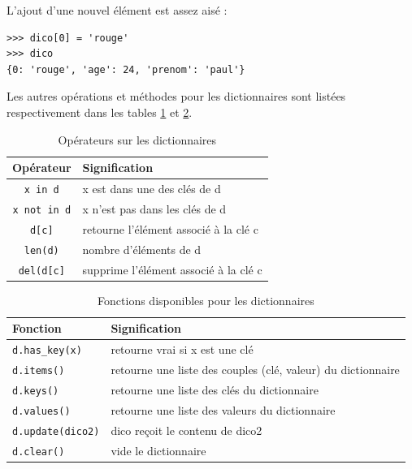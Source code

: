 \documentclass[12pt, a4paper]{article}
\begin{document}
L'ajout d'une nouvel élément est assez aisé :
\begin{lstlisting}
>>> dico[0] = 'rouge'
>>> dico
{0: 'rouge', 'age': 24, 'prenom': 'paul'}
\end{lstlisting}

Les autres opérations et méthodes pour les dictionnaires sont listées respectivement dans les tables \ref{tab:operateurs_dictionnaires} et \ref{tab:fonctions_dictionnaires}.

\begin{table}[H]
	\begin{center}
		\begin{tabular}{|c|l|}
			\hline
			\textbf{Opérateur} & \textbf{Signification} \\
			\hline
			\lstinline{x in d} & x est dans une des clés de d \\
			\lstinline{x not in d} & x n'est pas dans les clés de d \\
			\lstinline{d[c]} & retourne l'élément associé à la clé c \\
			\lstinline{len(d)}  & nombre d'éléments de d \\
			\lstinline{del(d[c]}  & supprime l'élément associé à la clé c \\
			\hline
		\end{tabular}
		\caption{Opérateurs sur les dictionnaires}
		\label{tab:operateurs_dictionnaires}
	\end{center}
\end{table}

\begin{table}[H]
	\begin{center}
		\begin{tabular}{|l|l|}
			\hline
			\textbf{Fonction} & \textbf{Signification} \\
			\hline
			\lstinline{d.has_key(x)} & retourne vrai si x est une clé \\
			\lstinline{d.items()} & retourne une liste des couples (clé, valeur) du dictionnaire \\
			\lstinline{d.keys()} & retourne une liste des clés du dictionnaire \\
			\lstinline{d.values()}  & retourne une liste des valeurs du dictionnaire \\
			\lstinline{d.update(dico2)}  & dico reçoit le contenu de dico2 \\
			\lstinline{d.clear()}  & vide le dictionnaire \\
			\hline
		\end{tabular}
		\caption{Fonctions disponibles pour les dictionnaires}
		\label{tab:fonctions_dictionnaires}
	\end{center}
\end{table}
\end{document}
